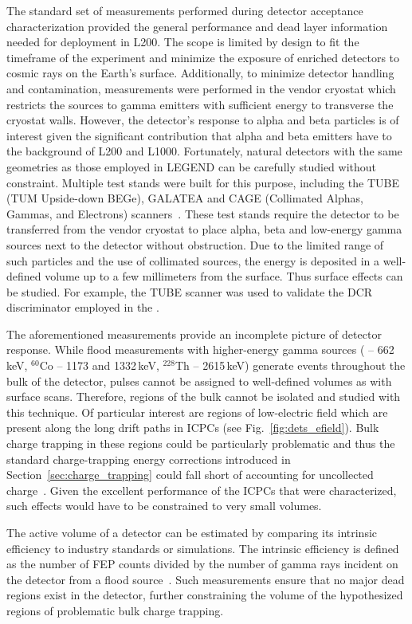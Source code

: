 The standard set of measurements performed during detector acceptance characterization provided the general performance and dead layer information needed for deployment in L200. The scope is limited by design to fit the timeframe of the experiment and minimize the exposure of enriched detectors to cosmic rays on the Earth's surface. Additionally, to minimize detector handling and contamination, measurements were performed in the vendor cryostat which restricts the sources to gamma emitters with sufficient energy to transverse the cryostat walls. However, the detector's response to alpha and beta particles is of interest given the significant contribution that alpha and beta emitters have to the background of L200 and L1000. Fortunately, natural detectors with the same geometries as those employed in LEGEND can be carefully studied without constraint. Multiple test stands were built for this purpose, including the TUBE (TUM Upside-down BEGe), GALATEA and CAGE (Collimated Alphas, Gammas, and Electrons) scanners~\cite{TUBE,GALATEA,CAGE}. These test stands require the detector to be transferred from the vendor cryostat to place alpha, beta and low-energy gamma sources next to the detector without obstruction. Due to the limited range of such particles and the use of collimated sources, the energy is deposited in a well-defined volume up to a few millimeters from the surface. Thus surface effects can be studied. For example, the TUBE scanner was used to validate the DCR discriminator employed in the {\MJDEMit}. 

The aforementioned measurements provide an incomplete picture of detector response. While flood measurements with higher-energy gamma sources (\CsS{} -- 662\,keV, $^{60}$Co -- 1173 and 1332\,keV, $^{228}$Th -- 2615\,keV) generate events throughout the bulk of the detector, pulses cannot be assigned to well-defined volumes as with surface scans. Therefore, regions of the bulk cannot be isolated and studied with this technique. Of particular interest are regions of low-electric field which are present along the long drift paths in ICPCs (see Fig.~\ref{fig:dets_efield}). Bulk charge trapping in these regions could be particularly problematic and thus the standard charge-trapping energy corrections introduced in Section~\ref{sec:charge_trapping} could fall short of accounting for uncollected charge~\cite{planar_charge_trapping}. Given the excellent performance of the ICPCs that were characterized, such effects would have to be constrained to very small volumes.  

The active volume of a detector can be estimated by comparing its intrinsic efficiency to industry standards or simulations. The intrinsic efficiency is defined as the number of FEP counts divided by the number of gamma rays incident on the detector from a flood source~\cite{knoll}. Such measurements ensure that no major dead regions exist in the detector, further constraining the volume of the hypothesized regions of problematic bulk charge trapping. 

